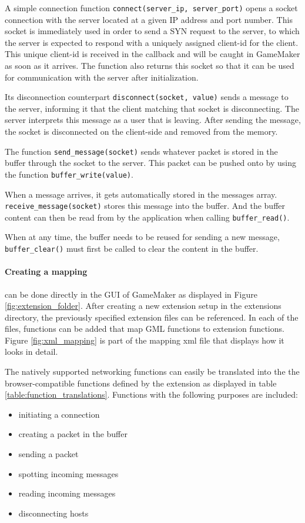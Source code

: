\documentclass[bsc, 12pt, twoside, singlespacing, parskip, abbrevs, notimes, normalheadings, logo]{styles/infthesis}
\begin{document}
A simple connection function \texttt{connect(server\_ip, server\_port)} opens a socket connection with the server located at a given IP address and port number.
This socket is immediately used in order to send a SYN request to the server, to which the server is expected to respond with a uniquely assigned client-id for the client. This unique client-id is received in the callback and will be caught in GameMaker as soon as it arrives.
The function also returns this socket so that it can be used for communication with the server after initialization.

Its disconnection counterpart \texttt{disconnect(socket, value)} sends a message to the server, informing it that the client matching that socket is disconnecting. The server interprets this message as a user that is leaving.
After sending the message, the socket is disconnected on the client-side and removed from the memory.

The function \texttt{send\_message(socket)} sends whatever packet is stored in the buffer through the socket to the server.
This packet can be pushed onto by using the function \texttt{buffer\_write(value)}.

When a message arrives, it gets automatically stored in the messages array. \texttt{receive\_message(socket)} stores this message into the buffer. And the buffer content can then be read from by the application when calling \texttt{buffer\_read()}.

When at any time, the buffer needs to be reused for sending a new message, \texttt{buffer\_clear()} must first be called to clear the content in the buffer. 

\paragraph*{Creating a mapping}
can be done directly in the GUI of GameMaker as displayed in Figure \ref{fig:extension_folder}. After creating a new extension setup in the extensions directory, the previously specified extension files can be referenced. In each of the files, functions can be added that map GML functions to extension functions. Figure \ref{fig:xml_mapping} is part of the mapping xml file that displays how it looks in detail.

The natively supported networking functions can easily be translated into the the browser-compatible functions defined by the extension as displayed in table \ref{table:function_translations}. Functions with the following purposes are included:
\begin{itemize}
	\item initiating a connection
	\item creating a packet in the buffer
	\item sending a packet
	\item spotting incoming messages
	\item reading incoming messages
	\item disconnecting hosts
\end{itemize} 
\end{document}
